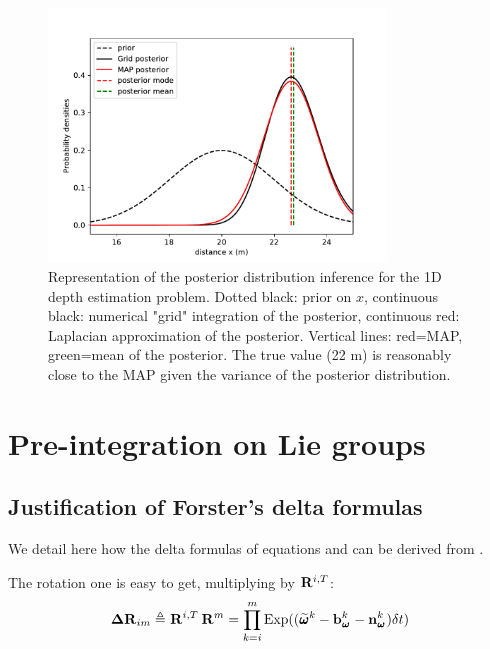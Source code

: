 \begin{figure}[h]
    \centering
    \includegraphics[width=0.8\textwidth]{figures/MAP_stereo1D.pdf}
    \caption{Representation of the posterior distribution inference for the 1D depth estimation problem. Dotted black: prior on $x$, 
    continuous black: numerical "grid" integration of the posterior, continuous red: Laplacian approximation of the posterior. 
    Vertical lines: red=MAP, green=mean of the posterior. The true value (22 m) is reasonably close to the MAP given the variance 
    of the posterior distribution.
    }
    \label{fig:MAP_stereo1D}
 \end{figure}







\chapter{Pre-integration on Lie groups}
\section{Justification of Forster's delta formulas}
\label{sec:forster_proof}
We detail here how the delta formulas of equations  and  can be derived from .

The rotation one is easy to get, multiplying by $\prescript{}{}{{\bf R}}_{}^{i,T}$:
\begin{equation}
    {\bm \Delta {\bf R}}_{im} \triangleq \prescript{}{}{{\bf R}}_{}^{i,T} \prescript{}{}{{\bf R}}_{}^{m} = \prod_{k=i}^{m} \operatorname*{Exp}((\prescript{}{}{\widetilde{\pmb{\omega}}}_{}^k - {\bf b}_{\prescript{}{}{\pmb{\omega}}_{}}^k - {\bf n}_{\prescript{}{}{\pmb{\omega}}_{}}^k)\delta t)
    \label{eq:IMUDeltaR}
\end{equation}

